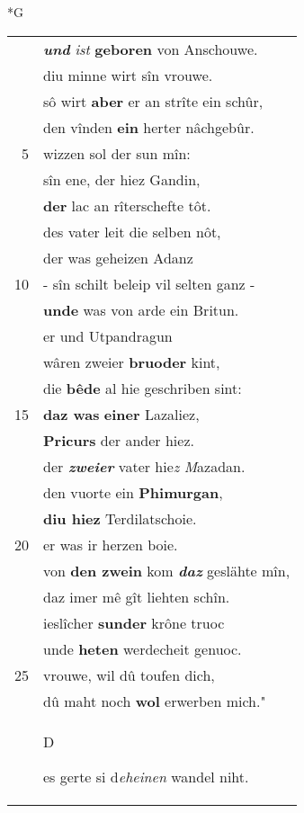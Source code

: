 \documentclass[8pt,a4paper,notitlepage]{article}
\begin{document}
\newpage
\begin{table}[ht]
\begin{minipage}[t]{0.5\linewidth}
\small
\begin{center}*G
\end{center}
\begin{tabular}{rl}
 & \textit{\textbf{und}} \textit{ist} \textbf{geboren} von Anschouwe.\\ 
 & diu minne wirt sîn vrouwe.\\ 
 & sô wirt \textbf{aber} er an strîte ein schûr,\\ 
 & den vînden \textbf{ein} herter nâchgebûr.\\ 
5 & wizzen sol der sun mîn:\\ 
 & sîn ene, der hiez Gandin,\\ 
 & \textbf{der} lac an rîterschefte tôt.\\ 
 & des vater leit die selben nôt,\\ 
 & der was geheizen Adanz\\ 
10 & - sîn schilt beleip vil selten ganz -\\ 
 & \textbf{unde} was von arde ein Britun.\\ 
 & er und Utpandragun\\ 
 & wâren zweier \textbf{bruoder} kint,\\ 
 & die \textbf{bêde} al hie geschriben sint:\\ 
15 & \textbf{daz was} \textbf{einer} Lazaliez,\\ 
 & \textbf{Pricurs} der ander hiez.\\ 
 & der \textit{\textbf{zweier}} vater hie\textit{z} \textit{M}azadan.\\ 
 & den vuorte ein \textbf{Phimurgan},\\ 
 & \textbf{diu hiez} Terdilatschoie.\\ 
20 & er was ir herzen boie.\\ 
 & von \textbf{den zwein} kom \textit{\textbf{daz}} geslähte mîn,\\ 
 & daz imer mê gît liehten schîn.\\ 
 & ieslîcher \textbf{sunder} krône truoc\\ 
 & unde \textbf{heten} werdecheit genuoc.\\ 
25 & vrouwe, wil dû toufen dich,\\ 
 & dû maht noch \textbf{wol} erwerben mich."\\ 
 & \begin{large}D\end{large}es gerte si d\textit{eheinen} wandel niht.\\ 

\end{tabular}
\end{minipage}
\end{table}
\end{document}

